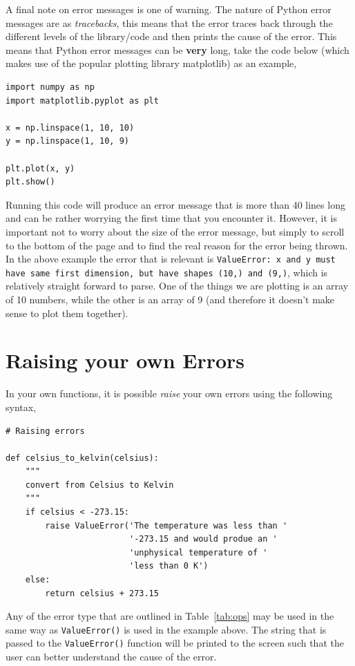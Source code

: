 \documentclass[a4paper]{article}
\begin{document}
A final note on error messages is one of warning.
The nature of Python error messages are as \emph{tracebacks}, this means that the error traces back through the different levels of the library/code and then prints the cause of the error.
This means that Python error messages can be \textbf{very} long, take the code below (which makes use of the popular plotting library matplotlib) as an example,
\begin{lstlisting}
import numpy as np
import matplotlib.pyplot as plt

x = np.linspace(1, 10, 10)
y = np.linspace(1, 10, 9)

plt.plot(x, y)
plt.show()
\end{lstlisting}
Running this code will produce an error message that is more than 40 lines long and can be rather worrying the first time that you encounter it.
However, it is important not to worry about the size of the error message, but simply to scroll to the bottom of the page and to find the real reason for the error being thrown.
In the above example the error that is relevant is \texttt{ValueError: x and y must have same first dimension, but have shapes (10,) and (9,)}, which is relatively straight forward to parse.
One of the things we are plotting is an array of 10 numbers, while the other is an array of 9 (and therefore it doesn't make sense to plot them together).

\section{Raising your own Errors}
In your own functions, it is possible \emph{raise} your own errors using the following syntax, 
\begin{lstlisting}
# Raising errors

def celsius_to_kelvin(celsius):
    """
    convert from Celsius to Kelvin
    """
    if celsius < -273.15:
        raise ValueError('The temperature was less than '
                         '-273.15 and would produe an '
                         'unphysical temperature of '
                         'less than 0 K')
    else:
        return celsius + 273.15
\end{lstlisting}
Any of the error type that are outlined in Table~\ref{tab:ops} may be used in the same way as \texttt{ValueError()} is used in the example above.
The string that is passed to the \texttt{ValueError()} function will be printed to the screen such that the user can better understand the cause of the error. 
\end{document}
